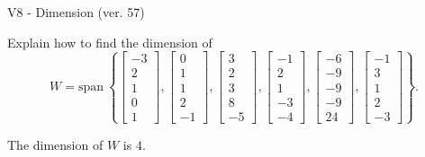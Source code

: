 \begin{exercise}
  \begin{exerciseTitle}V8 - Dimension (ver. 57)\end{exerciseTitle}
  \begin{exerciseStatement}
    Explain how to find the dimension of 
\[W=\mathrm{span}\ \left\{\left[\begin{array}{r}
-3 \\
2 \\
1 \\
0 \\
1
\end{array}\right] , \left[\begin{array}{r}
0 \\
1 \\
1 \\
2 \\
-1
\end{array}\right] , \left[\begin{array}{r}
3 \\
2 \\
3 \\
8 \\
-5
\end{array}\right] , \left[\begin{array}{r}
-1 \\
2 \\
1 \\
-3 \\
-4
\end{array}\right] , \left[\begin{array}{r}
-6 \\
-9 \\
-9 \\
-9 \\
24
\end{array}\right] , \left[\begin{array}{r}
-1 \\
3 \\
1 \\
2 \\
-3
\end{array}\right]\right\}.\]



  \end{exerciseStatement}
  \begin{exerciseAnswer}
   The dimension of \(W\) is  \(4\).
  


  \end{exerciseAnswer}
\end{exercise}